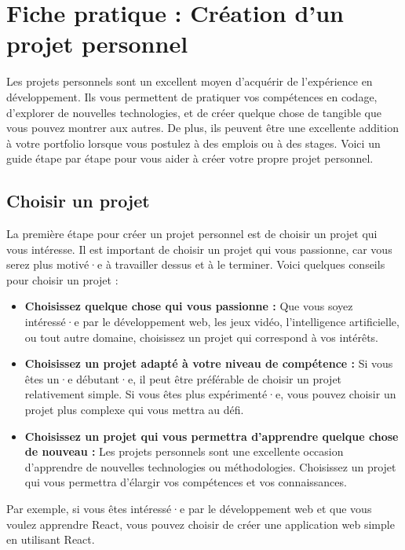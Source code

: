 \chapter{Fiche pratique : Création d'un projet personnel}

Les projets personnels sont un excellent moyen d'acquérir de l'expérience en développement. Ils vous permettent de pratiquer vos compétences en codage, d'explorer de nouvelles technologies, et de créer quelque chose de tangible que vous pouvez montrer aux autres. De plus, ils peuvent être une excellente addition à votre portfolio lorsque vous postulez à des emplois ou à des stages. Voici un guide étape par étape pour vous aider à créer votre propre projet personnel.

\section{Choisir un projet}

La première étape pour créer un projet personnel est de choisir un projet qui vous intéresse. Il est important de choisir un projet qui vous passionne, car vous serez plus motivé·e à travailler dessus et à le terminer. Voici quelques conseils pour choisir un projet :

\begin{itemize}
    \item \textbf{Choisissez quelque chose qui vous passionne :} Que vous soyez intéressé·e par le développement web, les jeux vidéo, l'intelligence artificielle, ou tout autre domaine, choisissez un projet qui correspond à vos intérêts.
    \item \textbf{Choisissez un projet adapté à votre niveau de compétence :} Si vous êtes un·e débutant·e, il peut être préférable de choisir un projet relativement simple. Si vous êtes plus expérimenté·e, vous pouvez choisir un projet plus complexe qui vous mettra au défi.
    \item \textbf{Choisissez un projet qui vous permettra d'apprendre quelque chose de nouveau :} Les projets personnels sont une excellente occasion d'apprendre de nouvelles technologies ou méthodologies. Choisissez un projet qui vous permettra d'élargir vos compétences et vos connaissances.
\end{itemize}

Par exemple, si vous êtes intéressé·e par le développement web et que vous voulez apprendre React, vous pouvez choisir de créer une application web simple en utilisant React.

